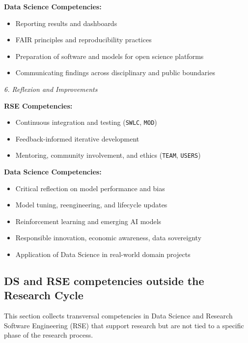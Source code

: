 \documentclass[
        english,biblatex
    ]{lni}
\providecommand{\tightlist}{%
    \setlength{\itemsep}{0pt}\setlength{\parskip}{0pt}}
\begin{document}
    \textbf{Data Science Competencies:}

    \begin{itemize}
    \tightlist
    \item
      Reporting results and dashboards
    \item
      FAIR principles and reproducibility practices
    \item
      Preparation of software and models for open science platforms
    \item
      Communicating findings across disciplinary and public boundaries
    \end{itemize}

    \emph{6. Reflexion and Improvements}

    \textbf{RSE Competencies:}

    \begin{itemize}
    \tightlist
    \item
      Continuous integration and testing (\texttt{SWLC}, \texttt{MOD})
    \item
      Feedback-informed iterative development
    \item
      Mentoring, community involvement, and ethics (\texttt{TEAM},
      \texttt{USERS})
    \end{itemize}

    \textbf{Data Science Competencies:}

    \begin{itemize}
    \tightlist
    \item
      Critical reflection on model performance and bias
    \item
      Model tuning, reengineering, and lifecycle updates
    \item
      Reinforcement learning and emerging AI models
    \item
      Responsible innovation, economic awareness, data sovereignty
    \item
      Application of Data Science in real-world domain projects
    \end{itemize}

    \subsection{DS and RSE competencies outside the Research
    Cycle}\label{ds-and-rse-competencies-outside-the-research-cycle}

    This section collects transversal competencies in Data Science and
    Research Software Engineering (RSE) that support research but are
    not tied to a specific phase of the research process.
\end{document}
